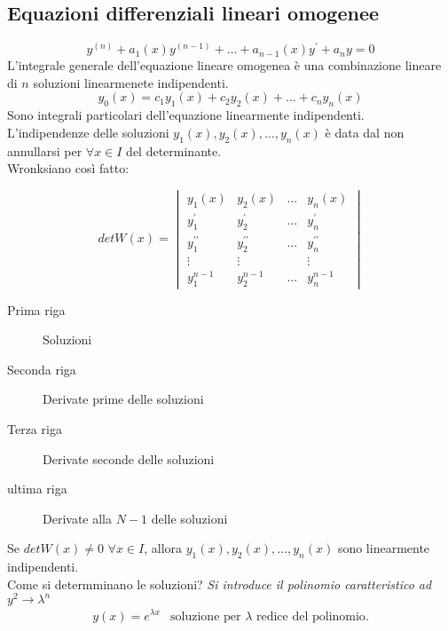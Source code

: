 \documentclass{book}
\begin{document}
\subsection{Equazioni differenziali lineari omogenee}
\begin{equation}
  y^{(n)}+a_1(x)y^{(n-1)}+\dots+a_{n-1}(x)y^{\prime}+a_ny=0
\end{equation}
L'integrale generale dell'equazione lineare omogenea è una combinazione lineare di $n$
soluzioni linearmenete indipendenti.
\begin{equation}
  y_0 (x)=c_1y_1(x)+c_2y_2(x)+\dots+c_ny_n(x)
\end{equation}
Sono integrali particolari dell'equazione linearmente indipendenti.\\
L'indipendenze delle soluzioni $y_1(x),y_2(x),\dots,y_n(x)$ è data dal non annullarsi per
$\forall x\in I$ del determinante.\\
{\color{red}Wronksiano} così fatto:
\begin{multicols}{2}
\begin{equation*}
  det W(x)=\begin{vmatrix}
             y_1(x) & y_2(x) & \dots & y_n(x) \\
             y_1^{\prime} & y_2^{\prime} &\dots& y_n^{\prime}\\
             y_1^{\prime\prime} & y_2^{\prime\prime} & \dots & y_n^{\prime\prime}\\
             \vdots & \vdots && \vdots\\ 
             y_1^{n-1} & y_2^{n-1} & \dots & y_n^{n-1}
           \end{vmatrix}
\end{equation*}
\begin{description}
    \item[Prima riga] Soluzioni
    \item[Seconda riga] Derivate prime delle soluzioni
    \item[Terza riga] Derivate seconde delle soluzioni
    \item[ultima riga] Derivate alla $N-1$ delle soluzioni
\end{description}
\end{multicols}    
Se $det W(x)\neq 0$ $\forall x\in I$, allora $y_1(x),y_2(x),\dots,y_n(x)$ sono linearmente
indipendenti.\\
Come si determminano le soluzioni? \emph{Si introduce il polinomio caratteristico ad }
$y^2 \to \lambda^{n}$ 
\begin{eqnarray*}
y(x)=e^{\lambda x} & \text{soluzione per $\lambda$ redice del polinomio}.
\end{eqnarray*}
\end{document}
